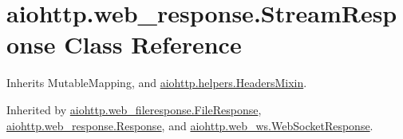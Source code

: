 \hypertarget{classaiohttp_1_1web__response_1_1_stream_response}{}\section{aiohttp.\+web\+\_\+response.\+Stream\+Response Class Reference}
\label{classaiohttp_1_1web__response_1_1_stream_response}


Inherits Mutable\+Mapping, and \hyperlink{classaiohttp_1_1helpers_1_1_headers_mixin}{aiohttp.\+helpers.\+Headers\+Mixin}.



Inherited by \hyperlink{classaiohttp_1_1web__fileresponse_1_1_file_response}{aiohttp.\+web\+\_\+fileresponse.\+File\+Response}, \hyperlink{classaiohttp_1_1web__response_1_1_response}{aiohttp.\+web\+\_\+response.\+Response}, and \hyperlink{classaiohttp_1_1web__ws_1_1_web_socket_response}{aiohttp.\+web\+\_\+ws.\+Web\+Socket\+Response}.

